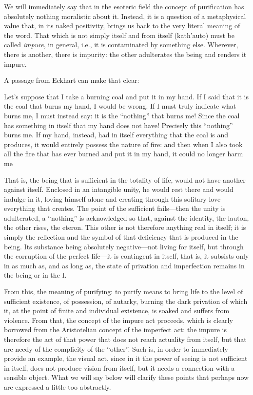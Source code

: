 We will immediately say that in the esoteric field the concept of purification has absolutely nothing moralistic about it. Instead, it is a question of a metaphysical value that, in its naked positivity, brings us back to the very literal meaning of the word. That which is not simply itself and from itself (kath'auto) must be called \emph{impure}, in general, i.e., it is contaminated by something else. Wherever, there is another, there is impurity: the other adulterates the being and renders it impure.

A passage from Eckhart can make that clear:

\begin{quotex}
Let's suppose that I take a burning coal and put it in my hand. If I said that it is the coal that burns my hand, I would be wrong. If I must truly indicate what burns me, I must instead say: it is the “nothing” that burns me! Since the coal has something in itself that my hand does not have! Precisely this “nothing” burns me. If my hand, instead, had in itself everything that the coal is and produces, it would entirely possess the nature of fire: and then when I also took all the fire that has ever burned and put it in my hand, it could no longer harm me 

\end{quotex}
That is, the being that is sufficient in the totality of life, would not have another against itself. Enclosed in an intangible unity, he would rest there and would indulge in it, loving himself alone and creating through this solitary love everything that creates. The point of the sufficient fails—then the unity is adulterated, a “nothing” is acknowledged so that, against the identity, the lauton, the other rises, the eteron. This other is not therefore anything real in itself; it is simply the reflection and the symbol of that deficiency that is produced in the being. Its substance being absolutely negative—not living for itself, but through the corruption of the perfect life—it is contingent in itself, that is, it subsists only in as much as, and as long as, the state of privation and imperfection remains in the being or in the I.

From this, the meaning of purifying: to purify means to bring life to the level of sufficient existence, of possession, of autarky, burning the dark privation of which it, at the point of finite and individual existence, is soaked and suffers from violence. From that, the concept of the impure act proceeds, which is clearly borrowed from the Aristotelian concept of the imperfect act: the impure is therefore the act of that power that does not reach actuality from itself, but that are needy of the complicity of the “other”. Such is, in order to immediately provide an example, the visual act, since in it the power of seeing is not sufficient in itself, does not produce vision from itself, but it needs a connection with a sensible object. What we will say below will clarify these points that perhaps now are expressed a little too abstractly.

